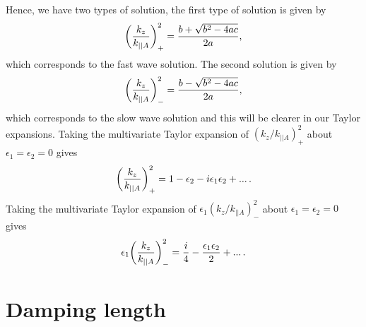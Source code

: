 Hence, we have two types of solution, the first type of solution is given by
\begin{equation}
    \label{eq:apdx_k_z+}
    \qty(\frac{k_z}{k_{||A}})_+^2 = \frac{b+\sqrt{b^2-4ac}}{2a},
\end{equation}
which corresponds to the fast wave solution. The second solution is given by
\begin{equation}
    \label{eq:apdx_k_z-}
    \qty(\frac{k_z}{k_{||A}})_-^2 = \frac{b-\sqrt{b^2-4ac}}{2a},
\end{equation}
which corresponds to the slow wave solution and this will be clearer in our Taylor expansions. Taking the multivariate Taylor expansion of $(k_z/k_{||A})_+^2$ about $\epsilon_1=\epsilon_2=0$ gives
\begin{equation}
    \label{eq:apdx_k_z+_taylor}
    \qty(\frac{k_z}{k_{||A}})_+^2 = 1 - \epsilon_2  - i\epsilon_1\epsilon_2 + ...\,.
\end{equation}
Taking the multivariate Taylor expansion of $\epsilon_1(k_z/k_{||A})_-^2$ about $\epsilon_1=\epsilon_2=0$ gives
\begin{equation}
    \label{eq:apdx_k_z-_taylor}
    \epsilon_1\qty(\frac{k_z}{k_{||A}})_-^2 = \frac{i}{4} - \frac{\epsilon_1 \epsilon_2}{2} + ...\,.
\end{equation}

\section{Damping length}

